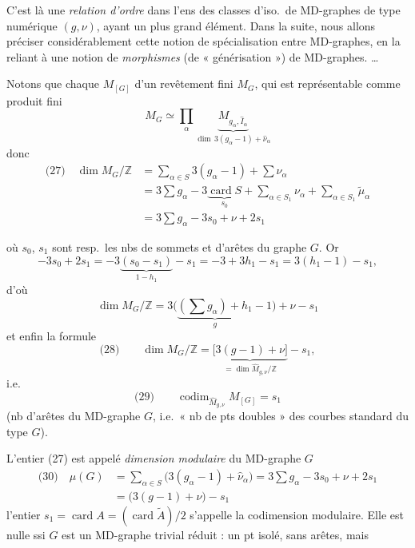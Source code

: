\documentclass[11pt,a4paper]{article}
\begin{document}
C'est là une \emph{relation d'ordre} dans l'ens des classes d'iso.\ de MD-graphes de type numérique $(g,\nu)$, ayant un plus grand élément. Dans la suite, nous allons préciser considérablement cette notion de spécialisation entre MD-graphes, en la reliant à une notion de \emph{morphismes} (de « générisation ») de MD-graphes. …

Notons que chaque $M_{[G]}$   d'un revêtement fini $M_G$, qui est représentable comme produit fini
\[
M_G \simeq \prod_\alpha \underbrace{M_{g_\alpha, \hat{I}_\alpha}}_{\dim\, 3(g_\alpha - 1) + \hat{\nu}_\alpha}
\]
donc
\begin{align*}
\text{(27)}\quad \dim M_G/\mathbb{Z}
  &= \sum_{\alpha\in S} 3(g_\alpha - 1) + \sum \hat{\nu}_\alpha \\
  &= 3\sum g_\alpha - 3\underbrace{\operatorname{card} S}_{s_0} + \sum_{\alpha\in S_1} \nu_\alpha + \sum_{\alpha\in S_1} \tilde{\mu}_\alpha \\
  &= 3\sum g_\alpha - 3s_0 + \nu + 2s_1
\end{align*}

où $s_0$, $s_1$ sont resp.\ les nbs de sommets et d'arêtes du graphe $G$. Or
\[
-3s_0 + 2s_1 = -3\underbrace{(s_0 - s_1)}_{1-h_1} - s_1 = -3 + 3h_1 - s_1 = 3(h_1 - 1) - s_1,
\]
d'où
\[
\dim M_G/\mathbb{Z} = 3\bigl(\underbrace{(\textstyle\sum g_\alpha) + h_1}_{g} - 1\bigr) + \nu - s_1
\]
et enfin la formule
\[
\text{(28)}\qquad \dim M_G/\mathbb{Z} = \underbrace{\bigl[3(g-1)+\nu\bigr]}_{= \dim \hat{M}_{g,\nu}/\mathbb{Z}} - s_1 ,
\]
i.e.
\[
\text{(29)}\qquad \operatorname{codim}_{\hat{M}_{g,\nu}} M_{[G]} = s_1
\]
(nb d'arêtes du MD-graphe $G$, i.e.\ « nb de pts doubles » des courbes standard du type $G$).

L'entier (27) est appelé \emph{dimension modulaire} du MD-graphe $G$
\begin{align*}
\text{(30)}\quad \mu(G) &= \sum_{\alpha\in S} \bigl(3(g_\alpha - 1) + \hat{\nu}_\alpha\bigr) = 3\sum g_\alpha - 3s_0 + \nu + 2s_1 \\
  &= \bigl(3(g-1) + \nu\bigr) - s_1
\end{align*}
l'entier $s_1 = \operatorname{card} A = (\operatorname{card} \tilde{A})/2$ s'appelle la codimension modulaire. Elle est nulle ssi $G$ est un MD-graphe trivial réduit : un pt isolé, sans arêtes, mais
\end{document}
